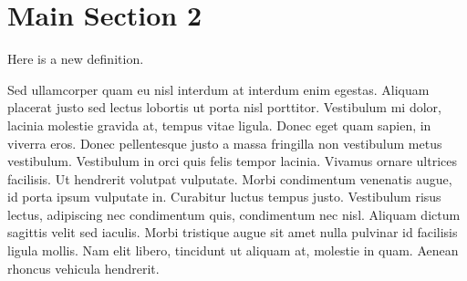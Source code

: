 \section{Main Section 2}


\begin{defn}Here is a new definition.\end{defn}

Sed ullamcorper quam eu nisl interdum at interdum enim egestas. Aliquam placerat justo sed lectus lobortis ut porta nisl porttitor. Vestibulum mi dolor, lacinia molestie gravida at, tempus vitae ligula. Donec eget quam sapien, in viverra eros. Donec pellentesque justo a massa fringilla non vestibulum metus vestibulum. Vestibulum in orci quis felis tempor lacinia. Vivamus ornare ultrices facilisis. Ut hendrerit volutpat vulputate. Morbi condimentum venenatis augue, id porta ipsum vulputate in. Curabitur luctus tempus justo. Vestibulum risus lectus, adipiscing nec condimentum quis, condimentum nec nisl. Aliquam dictum sagittis velit sed iaculis. Morbi tristique augue sit amet nulla pulvinar id facilisis ligula mollis. Nam elit libero, tincidunt ut aliquam at, molestie in quam. Aenean rhoncus vehicula hendrerit.
